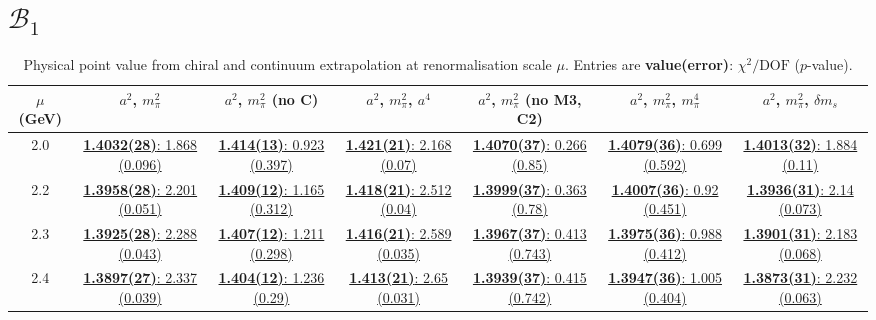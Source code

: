 \documentclass[12pt]{extarticle}
\begin{document}
\section{$\mathcal{B}_1$}
\begin{table}[h!]
\begin{center}
\begin{tabular}{|c|c|c|c|c|c|c|}
\hline
$\mu$ (GeV) & $a^2$, $m_\pi^2$& $a^2$, $m_\pi^2$ (no C)& $a^2$, $m_\pi^2$, $a^4$& $a^2$, $m_\pi^2$ (no M3, C2)& $a^2$, $m_\pi^2$, $m_\pi^4$& $a^2$, $m_\pi^2$, $\delta m_s$\\
\hline
2.0& \hyperlink{VVpAA/NPR/a2m2_20.pdf.1}{\textbf{1.4032(28)}: 1.868 (0.096)} & \hyperlink{VVpAA/NPR/a2m2noC_20.pdf.1}{\textbf{1.414(13)}: 0.923 (0.397)} & \hyperlink{VVpAA/NPR/a2a4m2_20.pdf.1}{\textbf{1.421(21)}: 2.168 (0.07)} & \hyperlink{VVpAA/NPR/a2m2mcut_20.pdf.1}{\textbf{1.4070(37)}: 0.266 (0.85)} & \hyperlink{VVpAA/NPR/a2m2m4_20.pdf.1}{\textbf{1.4079(36)}: 0.699 (0.592)} & \hyperlink{VVpAA/NPR/a2m2delm_20.pdf.1}{\textbf{1.4013(32)}: 1.884 (0.11)}\\
2.2& \hyperlink{VVpAA/NPR/a2m2_22.pdf.1}{\textbf{1.3958(28)}: 2.201 (0.051)} & \hyperlink{VVpAA/NPR/a2m2noC_22.pdf.1}{\textbf{1.409(12)}: 1.165 (0.312)} & \hyperlink{VVpAA/NPR/a2a4m2_22.pdf.1}{\textbf{1.418(21)}: 2.512 (0.04)} & \hyperlink{VVpAA/NPR/a2m2mcut_22.pdf.1}{\textbf{1.3999(37)}: 0.363 (0.78)} & \hyperlink{VVpAA/NPR/a2m2m4_22.pdf.1}{\textbf{1.4007(36)}: 0.92 (0.451)} & \hyperlink{VVpAA/NPR/a2m2delm_22.pdf.1}{\textbf{1.3936(31)}: 2.14 (0.073)}\\
2.3& \hyperlink{VVpAA/NPR/a2m2_23.pdf.1}{\textbf{1.3925(28)}: 2.288 (0.043)} & \hyperlink{VVpAA/NPR/a2m2noC_23.pdf.1}{\textbf{1.407(12)}: 1.211 (0.298)} & \hyperlink{VVpAA/NPR/a2a4m2_23.pdf.1}{\textbf{1.416(21)}: 2.589 (0.035)} & \hyperlink{VVpAA/NPR/a2m2mcut_23.pdf.1}{\textbf{1.3967(37)}: 0.413 (0.743)} & \hyperlink{VVpAA/NPR/a2m2m4_23.pdf.1}{\textbf{1.3975(36)}: 0.988 (0.412)} & \hyperlink{VVpAA/NPR/a2m2delm_23.pdf.1}{\textbf{1.3901(31)}: 2.183 (0.068)}\\
2.4& \hyperlink{VVpAA/NPR/a2m2_24.pdf.1}{\textbf{1.3897(27)}: 2.337 (0.039)} & \hyperlink{VVpAA/NPR/a2m2noC_24.pdf.1}{\textbf{1.404(12)}: 1.236 (0.29)} & \hyperlink{VVpAA/NPR/a2a4m2_24.pdf.1}{\textbf{1.413(21)}: 2.65 (0.031)} & \hyperlink{VVpAA/NPR/a2m2mcut_24.pdf.1}{\textbf{1.3939(37)}: 0.415 (0.742)} & \hyperlink{VVpAA/NPR/a2m2m4_24.pdf.1}{\textbf{1.3947(36)}: 1.005 (0.404)} & \hyperlink{VVpAA/NPR/a2m2delm_24.pdf.1}{\textbf{1.3873(31)}: 2.232 (0.063)}\\
\hline
\end{tabular}
\caption{Physical point value from chiral and continuum extrapolation at renormalisation scale $\mu$. Entries are \textbf{value(error)}: $\chi^2/\text{DOF}$ ($p$-value).}
\end{center}
\end{table}
\end{document}
